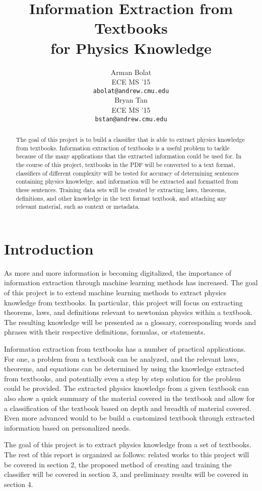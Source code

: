 \documentclass{article} %
\title{Information Extraction from Textbooks \\ for Physics Knowledge}
\author{
Arman Bolat \\
ECE MS '15 \\
\texttt{abolat@andrew.cmu.edu} \\
\And
Bryan Tan \\
ECE MS '15 \\
\texttt{bstan@andrew.cmu.edu} \\
}
\begin{document}
\maketitle


\begin{abstract}
The goal of this project is to build a classifier that is able to extract physics knowledge from textbooks. Information extraction of textbooks is a useful problem to tackle because of the many applications that the extracted information could be used for. In the course of this project, textbooks in the PDF will be converted to a text format, classifiers of different complexity will be tested for accuracy of determining sentences containing physics knowledge, and information will be extracted and formatted from these sentences. Training data sets will be created by extracting laws, theorems, definitions, and other knowledge in the text format textbook, and attaching any relevant material, such as context or metadata.
\end{abstract}

\section{Introduction}

As more and more information is becoming digitalized, the importance of information extraction through machine learning methods has increased. The goal of this project is to extend machine learning methods to extract physics knowledge from textbooks. In particular, this project will focus on extracting theorems, laws, and definitions relevant to newtonian physics within a textbook. The resulting knowledge will be presented as a glossary, corresponding words and phrases with their respective definitions, formulas, or statements.

Information extraction from textbooks has a number of practical applications. For one, a problem from a textbook can be analyzed, and the relevant laws, theorems, and equations can be determined by using the knowledge extracted from textbooks, and potentially even a step by step solution for the problem could be provided. The extracted physics knowledge from a given textbook can also show a quick summary of the material covered in the textbook and allow for a classification of the textbook based on depth and breadth of material covered. Even more advanced would to be build a customized textbook through extracted information based on personalized needs.

The goal of this project is to extract physics knowledge from a set of textbooks.
The rest of this report is organized as follows: related works to this project will be covered in section 2, the proposed method of creating and training the classifier will be covered in section 3, and preliminary results will be covered in section 4.
\end{document}
